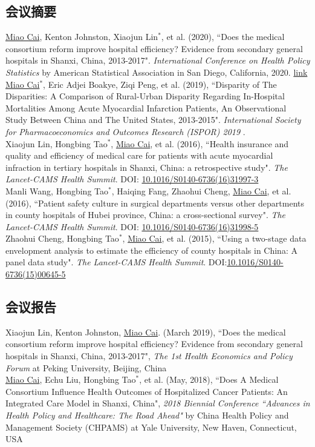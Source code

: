 \documentclass[11pt, a4paper]{article}
\newcommand{\years}[1]{\marginnote{\scriptsize #1}}
\begin{document}
\subsection*{会议摘要}
\noindent
\years{2020}\underline{Miao Cai}, Kenton Johnston, Xiaojun Lin$^\ast$, et al. (2020), ``Does the medical consortium reform improve hospital efficiency? Evidence from secondary general hospitals in Shanxi, China, 2013-2017". \emph{International Conference on Health Policy Statistics} by American Statistical Association in San Diego, California, 2020. \href{https://ww2.amstat.org/meetings/ichps/2020/onlineprogram/AbstractDetails.cfm?AbstractID=306703}{link}\\
\years{2019}\underline{Miao Cai$^\ast$}, Eric Adjei Boakye, Ziqi Peng, et al. (2019), ``Disparity of The Disparities: A Comparison of Rural-Urban Disparity Regarding In-Hospital Mortalities Among Acute Myocardial Infarction Patients, An Observational Study Between China and The United States, 2013-2015". \emph{International Society for Pharmacoeconomics and Outcomes Research (ISPOR) 2019 }. \\
\years{2016}Xiaojun Lin, Hongbing Tao$^\ast$, \underline{Miao Cai}, et al. (2016), ``Health insurance and quality and efficiency of medical care for patients with acute myocardial infraction in tertiary hospitals in Shanxi, China: a retrospective study". \emph{The Lancet-CAMS Health Summit}. DOI: \href{https://doi.org/10.1016/S0140-6736(16)31997-3}{10.1016/S0140-6736(16)31997-3}\\
\years{2016}Manli Wang, Hongbing Tao$^\ast$, Haiqing Fang, Zhaohui Cheng, \underline{Miao Cai}, et al. (2016), ``Patient safety culture in surgical departments versus other departments in county hospitals of Hubei province, China: a cross-sectional survey". \emph{The Lancet-CAMS Health Summit}. DOI: \href{https://doi.org/10.1016/S0140-6736(16)31998-5}{10.1016/S0140-6736(16)31998-5}\\
\years{2015}Zhaohui Cheng, Hongbing Tao$^\ast$, \underline{Miao Cai}, et al.  (2015), ``Using a two-stage data envelopment analysis to estimate the efficiency of county hospitals in China: A panel data study". \emph{The Lancet-CAMS Health Summit}. DOI:\href{https://doi.org/10.1016/S0140-6736(15)00645-5}{10.1016/S0140-6736(15)00645-5} 

\subsection*{会议报告}
\noindent
\years{2019}Xiaojun Lin, Kenton Johnston, \underline{Miao Cai}. (March 2019), ``Does the medical consortium reform improve hospital efficiency? Evidence from secondary general hospitals in Shanxi, China, 2013-2017", \emph{The 1st Health Economics and Policy Forum} at Peking University, Beijing, China\\
\years{2018}\underline{Miao Cai}, Echu Liu, Hongbing Tao$^\ast$, et al. (May, 2018), ``Does A Medical Consortium Influence Health Outcomes of Hospitalized Cancer Patients: An Integrated Care Model in Shanxi, China", \emph{2018 Biennial Conference ``Advances in Health Policy and Healthcare: The Road Ahead"} by China Health Policy and Management Society (CHPAMS) at Yale University, New Haven, Connecticut, USA
\end{document}
